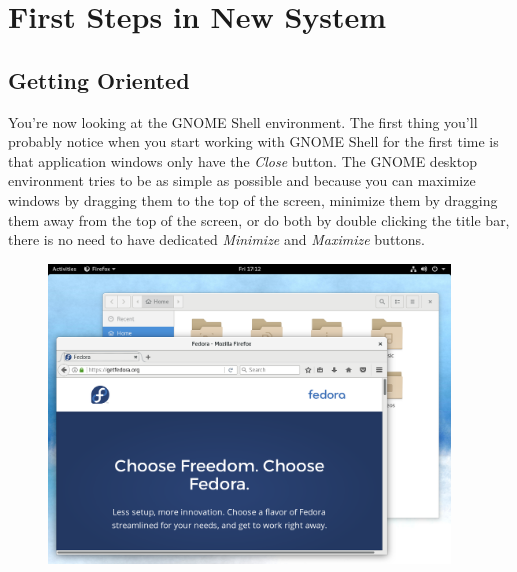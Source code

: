 \section*{First Steps in New System}
\subsection*{Getting Oriented}

You're now looking at the GNOME Shell environment. The first thing you'll probably notice when you start working with GNOME Shell for the first time is that application windows only have the \emph{Close} button. The GNOME desktop environment tries to be as simple as possible and because you can maximize windows by dragging them to the top of the screen, minimize them by dragging them away from the top of the screen, or do both by double clicking the title bar, there is no need to have dedicated \emph{Minimize} and \emph{Maximize} buttons.

\begin{figure}[ht]
\begin{center}
\includegraphics[width=0.95\textwidth]{img/shell-a}
 \label{fig:shell-a}
\end{center}
\end{figure}


